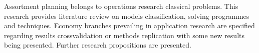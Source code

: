 
\begin{Abstrakt}
    Assortment planning belongs to operations research classical problems. This research provides literature review on models classification, solving programmes and techniques. Economy branches prevailing in application research are specified regarding results crossvalidation or methods replication with some new results being presented. Further research propositions are presented.
\end{Abstrakt}



\clearpage